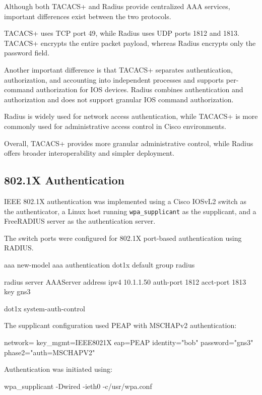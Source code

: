 \documentclass[12pt]{article}
\begin{document}
Although both TACACS+ and Radius provide centralized AAA services, important differences exist between the two protocols.

TACACS+ uses TCP port 49, while Radius uses UDP ports 1812 and 1813. TACACS+ encrypts the entire packet payload, whereas Radius encrypts only the password field.

Another important difference is that TACACS+ separates authentication, authorization, and accounting into independent processes and supports per-command authorization for IOS devices. Radius combines authentication and authorization and does not support granular IOS command authorization.

Radius is widely used for network access authentication, while TACACS+ is more commonly used for administrative access control in Cisco environments.

Overall, TACACS+ provides more granular administrative control, while Radius offers broader interoperability and simpler deployment.

\newpage

\subsection{802.1X Authentication}

IEEE 802.1X authentication was implemented using
a Cisco IOSvL2 switch as the authenticator,
a Linux host running \texttt{wpa\_supplicant}
as the supplicant, and a FreeRADIUS server
as the authentication server.

The switch ports were configured for 802.1X
port-based authentication using RADIUS.

\begin{configbox}
aaa new-model
aaa authentication dot1x default group radius

radius server AAAServer
 address ipv4 10.1.1.50 auth-port 1812 acct-port 1813
 key gns3

dot1x system-auth-control
\end{configbox}

The supplicant configuration used PEAP
with MSCHAPv2 authentication:

\begin{configbox}
network={
    key_mgmt=IEEE8021X
    eap=PEAP
    identity="bob"
    password="gns3"
    phase2="auth=MSCHAPV2"
}
\end{configbox}

Authentication was initiated using:

\begin{configbox}
wpa_supplicant -Dwired -ieth0 -c/usr/wpa.conf
\end{configbox}
\end{document}
